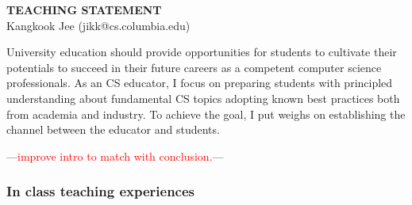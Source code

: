 \documentclass[letterpaper, 10pt]{article}
\newcommand{\jikk}[1]{{---\textcolor{red}{#1}---}}
\newcommand{\jikk}[1]{}
\begin{document}
\thispagestyle{fancy}

\lhead{}
\rhead{}

\renewcommand{\headrulewidth}{0pt} 
\renewcommand{\footrulewidth}{0pt} 

\fancyfoot[C]{\footnotesize
        \textcolor{gray}{http://www.cs.columbia.edu/$\sim$jikk/application}} 

\pagestyle{fancy}
\lhead{\textcolor{gray}{\it Kangkook Jee}}
\rhead{\textcolor{gray}{\thepage /\pageref{LastPage}}}

\begin{small}

\begin{center} {\LARGE \bf TEACHING STATEMENT}\\ \vspace*{0.1cm} {\normalsize
Kangkook Jee (jikk@cs.columbia.edu)} \end{center}
University education should provide opportunities for students to cultivate
their potentials to succeed in their future careers as a competent computer
science professionals.  
%
As an CS educator, I focus on preparing students with principled understanding
about fundamental CS topics adopting known best practices both from academia
and industry.
%
To achieve the goal, I put weighs on establishing the channel between the
educator and  students.

\jikk{improve intro to match with conclusion.}


\subsubsection*{In class teaching experiences}


\end{small}
\end{document}
